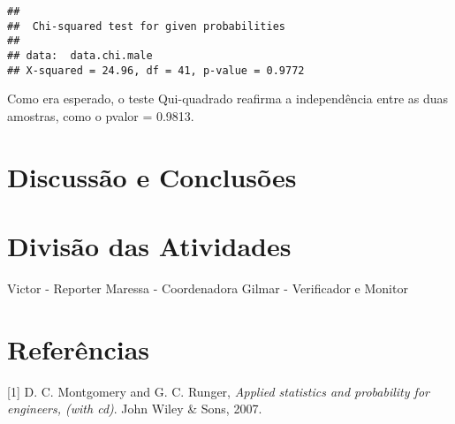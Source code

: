 \documentclass[]{article}
\begin{document}
\begin{verbatim}
## 
##  Chi-squared test for given probabilities
## 
## data:  data.chi.male
## X-squared = 24.96, df = 41, p-value = 0.9772
\end{verbatim}

Como era esperado, o teste Qui-quadrado reafirma a independência entre
as duas amostras, como o pvalor = 0.9813.

\hypertarget{discussao-e-conclusoes}{%
\section{Discussão e Conclusões}\label{discussao-e-conclusoes}}

\hypertarget{divisao-das-atividades}{%
\section{Divisão das Atividades}\label{divisao-das-atividades}}

Victor - Reporter Maressa - Coordenadora Gilmar - Verificador e Monitor

\hypertarget{referencias}{%
\section*{Referências}\label{referencias}}

\hypertarget{refs}{}
\leavevmode\hypertarget{ref-montgomery2007applied}{}%
{[}1{]} D. C. Montgomery and G. C. Runger, \emph{Applied statistics and
probability for engineers, (with cd)}. John Wiley \& Sons, 2007.
\end{document}
